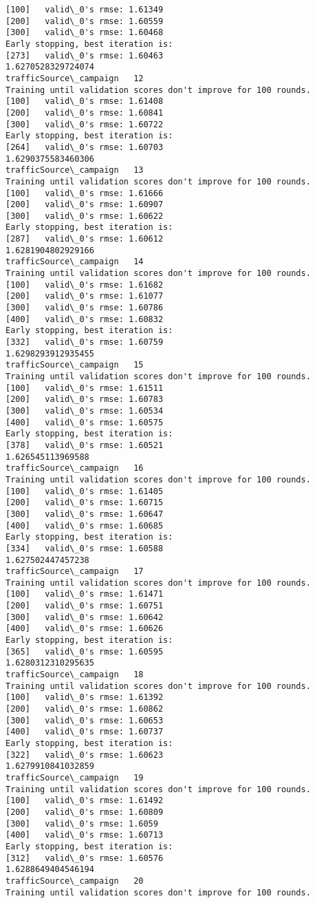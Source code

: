 \documentclass[11pt]{article}
\begin{document}
\begin{Verbatim}[commandchars=\\\{\}]
[100]	valid\_0's rmse: 1.61349
[200]	valid\_0's rmse: 1.60559
[300]	valid\_0's rmse: 1.60468
Early stopping, best iteration is:
[273]	valid\_0's rmse: 1.60463
1.6270528329724074
trafficSource\_campaign   12
Training until validation scores don't improve for 100 rounds.
[100]	valid\_0's rmse: 1.61408
[200]	valid\_0's rmse: 1.60841
[300]	valid\_0's rmse: 1.60722
Early stopping, best iteration is:
[264]	valid\_0's rmse: 1.60703
1.6290375583460306
trafficSource\_campaign   13
Training until validation scores don't improve for 100 rounds.
[100]	valid\_0's rmse: 1.61666
[200]	valid\_0's rmse: 1.60907
[300]	valid\_0's rmse: 1.60622
Early stopping, best iteration is:
[287]	valid\_0's rmse: 1.60612
1.6281904802929166
trafficSource\_campaign   14
Training until validation scores don't improve for 100 rounds.
[100]	valid\_0's rmse: 1.61682
[200]	valid\_0's rmse: 1.61077
[300]	valid\_0's rmse: 1.60786
[400]	valid\_0's rmse: 1.60832
Early stopping, best iteration is:
[332]	valid\_0's rmse: 1.60759
1.6298293912935455
trafficSource\_campaign   15
Training until validation scores don't improve for 100 rounds.
[100]	valid\_0's rmse: 1.61511
[200]	valid\_0's rmse: 1.60783
[300]	valid\_0's rmse: 1.60534
[400]	valid\_0's rmse: 1.60575
Early stopping, best iteration is:
[378]	valid\_0's rmse: 1.60521
1.626545113969588
trafficSource\_campaign   16
Training until validation scores don't improve for 100 rounds.
[100]	valid\_0's rmse: 1.61405
[200]	valid\_0's rmse: 1.60715
[300]	valid\_0's rmse: 1.60647
[400]	valid\_0's rmse: 1.60685
Early stopping, best iteration is:
[334]	valid\_0's rmse: 1.60588
1.627502447457238
trafficSource\_campaign   17
Training until validation scores don't improve for 100 rounds.
[100]	valid\_0's rmse: 1.61471
[200]	valid\_0's rmse: 1.60751
[300]	valid\_0's rmse: 1.60642
[400]	valid\_0's rmse: 1.60626
Early stopping, best iteration is:
[365]	valid\_0's rmse: 1.60595
1.6280312310295635
trafficSource\_campaign   18
Training until validation scores don't improve for 100 rounds.
[100]	valid\_0's rmse: 1.61392
[200]	valid\_0's rmse: 1.60862
[300]	valid\_0's rmse: 1.60653
[400]	valid\_0's rmse: 1.60737
Early stopping, best iteration is:
[322]	valid\_0's rmse: 1.60623
1.6279910841032859
trafficSource\_campaign   19
Training until validation scores don't improve for 100 rounds.
[100]	valid\_0's rmse: 1.61492
[200]	valid\_0's rmse: 1.60809
[300]	valid\_0's rmse: 1.6059
[400]	valid\_0's rmse: 1.60713
Early stopping, best iteration is:
[312]	valid\_0's rmse: 1.60576
1.6288649404546194
trafficSource\_campaign   20
Training until validation scores don't improve for 100 rounds.

\end{Verbatim}
\end{document}
